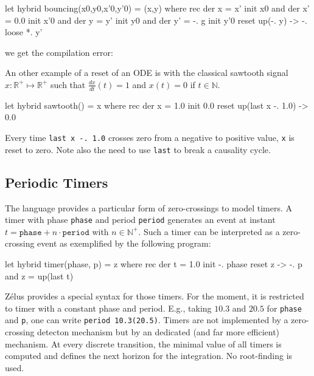 \documentclass[11pt,titlepage,twoside]{report}
\newcommand{\zelus}{{\sf Z\'elus}}
\newcommand{\DotNotation}[1]{\frac{\mathit{d}{#1}}{\mathit{dt}}}
\newcommand{\bR}{\mathbb{R}}
\newcommand{\bN}{\mathbb{N}}
\newcommand{\Marc}[1]{{\bf Marc.} {#1} {\bf Fin}}
\begin{document}
\begin{runverbatim}[include=gravity,fail]
let hybrid bouncing(x0,y0,x'0,y'0) = (x,y) where
 rec der x = x' init x0
 and der x' = 0.0 init x'0
 and der y = y' init y0
 and der y' = -. g init y'0 reset up(-. y) -> -. loose *. y'
\end{runverbatim}
we get the compilation error:
\runverbatimerr{}


An other example of a reset of an \ac{ODE} is with the classical sawtooth
signal $x: \bR^+ \mapsto \bR^+$ such that $\DotNotation{x}(t) = 1$ and
$x(t) = 0$ if $t\in\bN$.

\begin{runverbatim}[withresult]
let hybrid sawtooth() = x where
  rec der x = 1.0 init 0.0 reset up(last x -. 1.0) -> 0.0
\end{runverbatim}
%
Every time \texttt{last x -. 1.0} crosses zero from a negative to positive value,
\texttt{x} is reset to zero. Note also the need to use \texttt{last} to break
a causality cycle.

\subsection{Periodic Timers}
The language provides a particular form of zero-crossings to model
timers. A timer with phase \texttt{phase} and period \texttt{period} generates
an event at instant $t = \mathtt{phase} + n \cdot \mathtt{period}$ with
$n \in \bN^+$. Such a timer can be interpreted as a zero-crossing event as
exemplified by the following program:

\begin{runverbatim}[withresult]
let hybrid timer(phase, p) = z where
  rec der t = 1.0 init -. phase reset z -> -. p
  and z = up(last t)
\end{runverbatim}

\zelus{} provides a special syntax for those timers. For the moment,
it is restricted to timer with a constant phase and period. E.g.,
taking $10.3$ and $20.5$ for \texttt{phase} and \texttt{p}, one can
write \texttt{period 10.3(20.5)}. Timers are not implemented by a 
zero-crossing detecton mechanism
but by an dedicated (and far more efficient) mechanism. At every discrete transition,
the minimal value of all timers is computed and defines the next horizon for the
integration. No root-finding is used.
\end{document}
